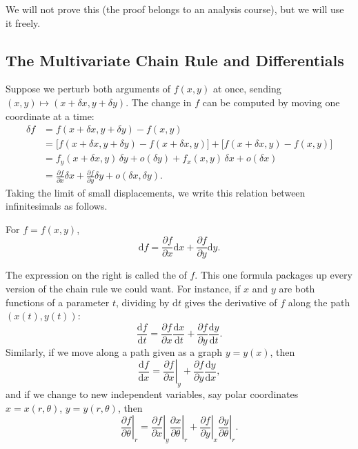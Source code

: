 \documentclass[a4paper]{scrartcl}
\begin{document}
We will not prove this (the proof belongs to an analysis course), but we will use it freely.

\subsection{The Multivariate Chain Rule and Differentials}

Suppose we perturb both arguments of $f(x, y)$ at once, sending $(x, y) \mapsto (x + \delta x, y + \delta y)$. The change in $f$ can be computed by moving one coordinate at a time:
\begin{align*}
	\delta f &= f(x + \delta x, y + \delta y) - f(x, y) \\
	&= \big[f(x + \delta x, y + \delta y) - f(x + \delta x, y)\big] + \big[f(x + \delta x, y) - f(x, y)\big] \\
	&= f_y(x + \delta x, y) \, \delta y + o(\delta y) + f_x(x, y)\, \delta x + o(\delta x) \\
	&= \frac{\partial f}{\partial x} \delta x + \frac{\partial f}{\partial y} \delta y + o(\delta x, \delta y).
\end{align*}
Taking the limit of small displacements, we write this relation between infinitesimals as follows.

\begin{theorem}
	For $f = f(x, y)$,
	$$
	\mathrm{d}f = \frac{\partial f}{\partial x} \mathrm{d}x + \frac{\partial f}{\partial y} \mathrm{d}y.
	$$
\end{theorem}

The expression on the right is called the  of $f$. This one formula packages up every version of the chain rule we could want. For instance, if $x$ and $y$ are both functions of a parameter $t$, dividing by $\mathrm{d}t$ gives the derivative of $f$ along the path $(x(t), y(t))$:
$$
\frac{\mathrm{d}f}{\mathrm{d}t} = \frac{\partial f}{\partial x} \frac{\mathrm{d}x}{\mathrm{d}t} + \frac{\partial f}{\partial y} \frac{\mathrm{d}y}{\mathrm{d}t}.
$$
Similarly, if we move along a path given as a graph $y = y(x)$, then
$$
\frac{\mathrm{d}f}{\mathrm{d}x} = \left.\frac{\partial f}{\partial x}\right|_y + \frac{\partial f}{\partial y} \frac{\mathrm{d}y}{\mathrm{d}x},
$$
and if we change to new independent variables, say polar coordinates $x = x(r, \theta)$, $y = y(r, \theta)$, then
$$
\left.\frac{\partial f}{\partial \theta}\right|_r = \left.\frac{\partial f}{\partial x}\right|_y \left.\frac{\partial x}{\partial \theta}\right|_r + \left.\frac{\partial f}{\partial y}\right|_x \left.\frac{\partial y}{\partial \theta}\right|_r.
$$
\end{document}
